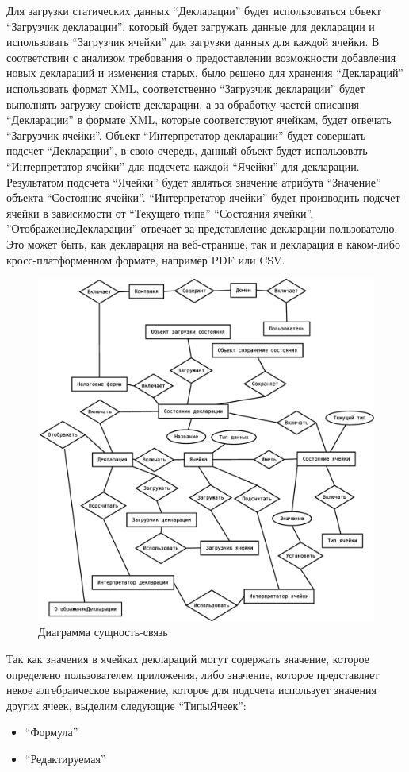 \documentclass[14pt,a4paper]{reportmod}
\begin{document}
Для загрузки статических данных ``Декларации'' будет использоваться объект ``Загрузчик декларации'', который будет загружать данные для декларации и использовать ``Загрузчик ячейки'' для загрузки данных для каждой ячейки. В соответствии с анализом требования о предоставлении возможности добавления новых деклараций и изменения старых, было решено для хранения ``Деклараций'' использовать формат XML, соответственно ``Загрузчик декларации'' будет выполнять загрузку свойств декларации, а за обработку частей описания ``Декларации'' в формате XML, которые соответствуют ячейкам, будет отвечать ``Загрузчик ячейки''.
Объект ``Интерпретатор декларации'' будет совершать подсчет ``Декларации'', в свою очередь, данный объект будет использовать ``Интерпретатор ячейки'' для подсчета каждой ``Ячейки'' для декларации. Результатом подсчета ``Ячейки'' будет являться значение атрибута ``Значение'' объекта ``Состояние ячейки''. ``Интерпретатор ячейки'' будет производить подсчет ячейки в зависимости от ``Текущего типа'' ``Состояния ячейки''.
''ОтображениеДекларации'' отвечает за представление декларации пользователю. Это может быть, как декларация на веб-странице, так и декларация в каком-либо кросс-платформенном формате, например PDF или CSV.
\begin{figure}
  \centering
  \includegraphics[scale=0.4]{uml/entity}
  \caption{Диаграмма сущность-связь}
  \label{pic:er_diagram}
\end{figure}
Так как значения в ячейках деклараций могут содержать значение, которое определено пользователем приложения, либо значение, которое представляет некое алгебраическое выражение, которое для подсчета использует значения других ячеек, выделим следующие ``ТипыЯчеек'':
\begin{itemize}
  \item ``Формула''
  \item ``Редактируемая''
\end{itemize}
\end{document}

